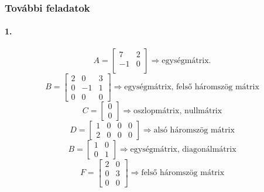 \documentclass[12pt,a4paper,fleqn]{article}
\newcommand{\myparagraph}[1]{\paragraph{#1}\mbox{}}
\begin{document}
\subsubsection{További feladatok}
\myparagraph{1.}
\[
  A = \begin{bmatrix} 7 & 2 \\ -1 & 0 \\ \end{bmatrix} \Rightarrow
    \text{egységmátrix.}
\]
\[
  B = \begin{bmatrix} 2 & 0 & 3 \\ 0 & -1 & 1 \\ 0 & 0 & 0 \end{bmatrix}
    \Rightarrow \text{egységmátrix, felső háromszög mátrix}
\]
\[
  C = \begin{bmatrix} 0 \\ 0 \end{bmatrix}
    \Rightarrow \text{oszlopmátrix, nullmátrix}
\]
\[
  D = \begin{bmatrix} 1 & 0 & 0 & 0 \\ 2 & 0 & 0 & 0 \end{bmatrix}
    \Rightarrow \text{alsó háromszög mátrix}
\]
\[
  B = \begin{bmatrix} 1 & 0 \\ 0 & 1 \end{bmatrix}
    \Rightarrow \text{egységmátrix, diagonálmátrix}
\]
\[
  F = \begin{bmatrix} 2 & 0 \\ 0 & 3 \\ 0 & 0 \end{bmatrix}
    \Rightarrow \text{felső háromszög mátrix}
\]
\end{document}
